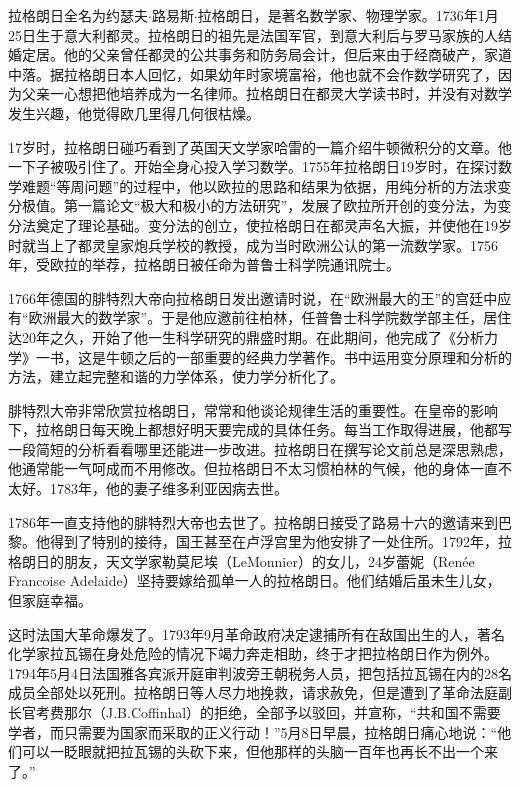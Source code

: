 \documentclass[b5paper]{ctexart}
\begin{document}
拉格朗日全名为约瑟夫$\cdot$路易斯$\cdot$拉格朗日，是著名数学家、物理学家。1736年1月25日生于意大利都灵。拉格朗日的祖先是法国军官，到意大利后与罗马家族的人结婚定居。他的父亲曾任都灵的公共事务和防务局会计，但后来由于经商破产，家道中落。据拉格朗日本人回忆，如果幼年时家境富裕，他也就不会作数学研究了，因为父亲一心想把他培养成为一名律师。拉格朗日在都灵大学读书时，并没有对数学发生兴趣，他觉得欧几里得几何很枯燥。

17岁时，拉格朗日碰巧看到了英国天文学家哈雷的一篇介绍牛顿微积分的文章。他一下子被吸引住了。开始全身心投入学习数学。1755年拉格朗日19岁时，在探讨数学难题“等周问题”的过程中，他以欧拉的思路和结果为依据，用纯分析的方法求变分极值。第一篇论文“极大和极小的方法研究”，发展了欧拉所开创的变分法，为变分法奠定了理论基础。变分法的创立，使拉格朗日在都灵声名大振，并使他在19岁时就当上了都灵皇家炮兵学校的教授，成为当时欧洲公认的第一流数学家。1756年，受欧拉的举荐，拉格朗日被任命为普鲁士科学院通讯院士。

1766年德国的腓特烈大帝向拉格朗日发出邀请时说，在“欧洲最大的王”的宫廷中应有“欧洲最大的数学家”。于是他应邀前往柏林，任普鲁士科学院数学部主任，居住达20年之久，开始了他一生科学研究的鼎盛时期。在此期间，他完成了《分析力学》一书，这是牛顿之后的一部重要的经典力学著作。书中运用变分原理和分析的方法，建立起完整和谐的力学体系，使力学分析化了。

腓特烈大帝非常欣赏拉格朗日，常常和他谈论规律生活的重要性。在皇帝的影响下，拉格朗日每天晚上都想好明天要完成的具体任务。每当工作取得进展，他都写一段简短的分析看看哪里还能进一步改进。拉格朗日在撰写论文前总是深思熟虑，他通常能一气呵成而不用修改。但拉格朗日不太习惯柏林的气候，他的身体一直不太好。1783年，他的妻子维多利亚因病去世。

1786年一直支持他的腓特烈大帝也去世了。拉格朗日接受了路易十六的邀请来到巴黎。他得到了特别的接待，国王甚至在卢浮宫里为他安排了一处住所。1792年，拉格朗日的朋友，天文学家勒莫尼埃（LeMonnier）的女儿，24岁蕾妮（Renée Francoise Adelaide）坚持要嫁给孤单一人的拉格朗日。他们结婚后虽未生儿女，但家庭幸福。

这时法国大革命爆发了。1793年9月革命政府决定逮捕所有在敌国出生的人，著名化学家拉瓦锡在身处危险的情况下竭力奔走相助，终于才把拉格朗日作为例外。1794年5月4日法国雅各宾派开庭审判波旁王朝税务人员，把包括拉瓦锡在内的28名成员全部处以死刑。拉格朗日等人尽力地挽救，请求赦免，但是遭到了革命法庭副长官考费那尔（J.B.Coffinhal）的拒绝，全部予以驳回，并宣称，“共和国不需要学者，而只需要为国家而采取的正义行动！”5月8日早晨，拉格朗日痛心地说：“他们可以一眨眼就把拉瓦锡的头砍下来，但他那样的头脑一百年也再长不出一个来了。”\cite{Wiki-Lagrange}
\end{document}
